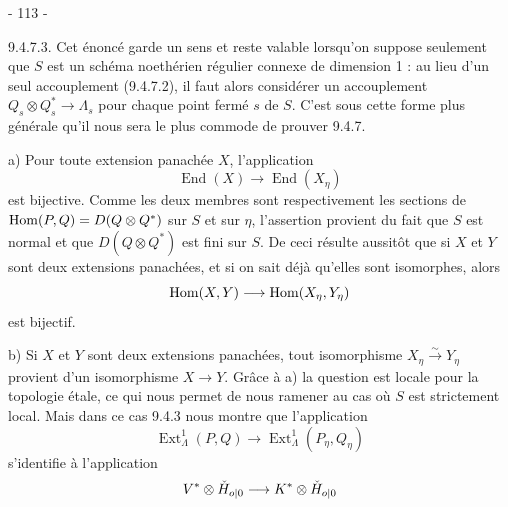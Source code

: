 \begin{center}- 113 -\end{center}

9.4.7.3. Cet énoncé garde un sens et reste valable lorsqu'on suppose seulement que $S$ est un schéma noethérien régulier connexe de dimension 1 : au lieu d'un seul accouplement (9.4.7.2), il faut alors considérer un accouplement $Q_s\otimes Q_s^*\longrightarrow\Lambda_s$ pour chaque point fermé $s$ de $S$. C'est sous cette forme plus générale qu'il nous sera le plus commode de prouver 9.4.7.

a) Pour toute extension panachée $X$, l'application
\[
\operatorname{End}(X)\longrightarrow\operatorname{End}(X_\eta)
\]
est bijective. Comme les deux membres sont respectivement les sections de ${\operatorname{Hom}}(P,Q)=D(Q\otimes Q^*)$ sur $S$ et sur $\eta$, l'assertion provient du fait que $S$ est normal et que $D(Q\otimes Q^*)$ est fini sur $S$. De ceci résulte aussitôt que si $X$ et $Y$ sont deux extensions panachées, et si on sait déjà qu'elles sont isomorphes, alors
\[
{\operatorname{Hom}}(X,Y)\longrightarrow{\operatorname{Hom}}(X_\eta,Y_\eta)
\]
est bijectif.

b) Si $X$ et $Y$ sont deux extensions panachées, tout isomorphisme $X_\eta\xrightarrow{\sim}Y_\eta$ provient d'un isomorphisme $X\longrightarrow Y$. Grâce à a) la question est locale pour la topologie étale, ce qui nous permet de nous ramener au cas où $S$ est strictement local. Mais dans ce cas 9.4.3 nous montre que l'application
\[
\operatorname{Ext}^1_\Lambda(P,Q)\longrightarrow\operatorname{Ext}^1_\Lambda(P_\eta,Q_\eta)
\]
s'identifie à l'application
\[
V^*\otimes\check H_{{o|0}}\longrightarrow K^*\otimes\check H_{{o|0}}
\]
